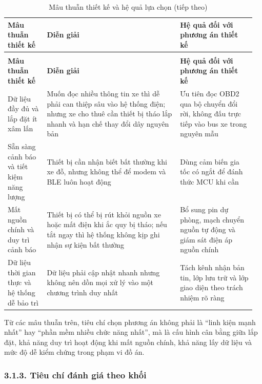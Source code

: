 \documentclass[a4paper]{extarticle}
\newcommand{\thesissettableid}[2]{%
  \renewcommand{\thetable}{#1}%
  \renewcommand{\theHtable}{#2}%
}
\begin{document}
{\thesissettableid{3.1}{condensed-bang-3-1-mau-thuan-thiet-ke-va-he-qua-lua-chon}
\def\LTcaptype{table}
\begin{longtable}{|L{0.154\linewidth}|L{0.513\linewidth}|L{0.291\linewidth}|}
\caption{Mâu thuẫn thiết kế và hệ quả lựa chọn}\label{tab:condensed-bang-3-1-mau-thuan-thiet-ke-va-he-qua-lua-chon}\\
\hline
\textbf{Mâu thuẫn thiết kế} & \textbf{Diễn giải} & \textbf{Hệ quả đối với phương án thiết kế} \\
\hline
\endfirsthead
\caption[]{Mâu thuẫn thiết kế và hệ quả lựa chọn (tiếp theo)}\\
\hline
\textbf{Mâu thuẫn thiết kế} & \textbf{Diễn giải} & \textbf{Hệ quả đối với phương án thiết kế} \\
\hline
\endhead
\endfoot
\endlastfoot
Dữ liệu đầy đủ và lắp đặt ít xâm lấn & Muốn đọc nhiều thông tin xe thì dễ phải can thiệp sâu vào hệ thống điện; nhưng xe cho thuê cần thiết bị tháo lắp nhanh và hạn chế thay đổi dây nguyên bản & Ưu tiên đọc OBD2 qua bộ chuyển đổi rời, không đấu trực tiếp vào bus xe trong nguyên mẫu \\\hline
Sẵn sàng cảnh báo và tiết kiệm năng lượng & Thiết bị cần nhận biết bất thường khi xe đỗ, nhưng không thể để modem và BLE luôn hoạt động & Dùng cảm biến gia tốc có ngắt để đánh thức MCU khi cần \\\hline
Mất nguồn chính và duy trì cảnh báo & Thiết bị có thể bị rút khỏi nguồn xe hoặc mất điện khi ắc quy bị tháo; nếu tắt ngay thì hệ thống không kịp ghi nhận sự kiện bất thường & Bổ sung pin dự phòng, mạch chuyển nguồn tự động và giám sát điện áp nguồn chính \\\hline
Dữ liệu thời gian thực và hệ thống dễ bảo trì & Dữ liệu phải cập nhật nhanh nhưng không nên dồn mọi xử lý vào một chương trình duy nhất & Tách kênh nhận bản tin, lớp lưu trữ và lớp giao diện theo trách nhiệm rõ ràng \\\hline
\end{longtable}
}

Từ các mâu thuẫn trên, tiêu chí chọn phương án không phải là ``linh kiện mạnh nhất'' hay ``phần mềm nhiều chức năng nhất'', mà là cấu hình cân bằng giữa lắp đặt, khả năng duy trì hoạt động khi mất nguồn chính, khả năng lấy dữ liệu và mức độ dễ kiểm chứng trong phạm vi đồ án.

\subsubsection{3.1.3. Tiêu chí đánh giá theo khối}\label{tiuxeau-chuxed-ux111uxe1nh-giuxe1-theo-khux1ed1i}
\end{document}
